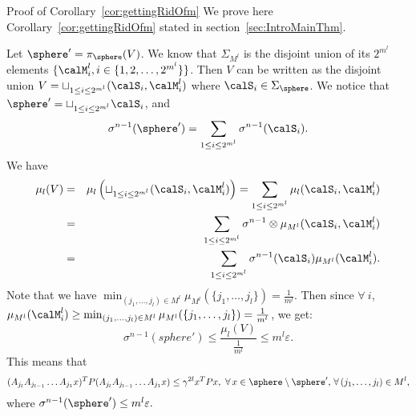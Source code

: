 \begin{section}{Proof of Corollary~\ref{cor:gettingRidOfm}}\label{proof:cor_m}
We prove here Corollary~\ref{cor:gettingRidOfm} stated in section~\ref{sec:IntroMainThm}.

Let $\sphere' = \pi_{\sphere}(V)$. We know that $\Sigma_{M^l}$ is the disjoint union of its $2^{m^l}$ elements $\{\calM^l_i, i \in \{1,2, \dots, 2^{m^l} \} \}$. Then $V$ can be written as the disjoint union $V = \sqcup_{1 \leq i \leq 2^{m^l}} (\calS_i, \calM^l_i)$ where $\calS_i \in \Sigma_{\sphere}$. We notice that 
$\sphere' = \sqcup_{1 \leq i \leq 2^{m^l}} \calS_i$, 
and
\begin{equation*}
\sigma^{n-1} (\sphere') = \sum_{1 \leq i \leq 2^{m^l}} \sigma^{n-1} (\calS_i).
\end{equation*}
We have 
\begin{eqnarray*}
\mu_l(V) &=& \mu_l \left( \sqcup_{1 \leq i \leq 2^{m^l}} (\calS_i, \calM^l_i) \right) = \sum_{1 \leq i \leq 2^{m^l}} \mu_l(\calS_i, \calM^l_i) \\
 &=& \sum_{1 \leq i \leq 2^{m^l}} \sigma^{n-1} \otimes \mu_{M^l} (\calS_i, \calM^l_i) \\
 & = &\sum_{1 \leq i \leq 2^{m^l}} \sigma^{n-1}(\calS_i) \mu_{M^l} (\calM^l_i).
\end{eqnarray*}
Note that we have $\min_{(j_1,\dots,j_l) \in M^l} \mu_{M^l}(\{j_1,\dots,j_l\}) = \frac{1}{m^l}.$ Then since $ \forall \ i$, $\mu_{M^l}(\calM^l_i) \geq \min_{(j_1,\dots,j_l) \in M^l} \mu_{M^l}(\{j_1,\dots,j_l\}) = \frac{1}{m^l}$, we get:
\begin{equation}
\sigma^{n-1}(sphere') \leq \frac{\mu_l(V)}{\frac{1}{m^l}} \leq m^l \varepsilon.
\end{equation}
This means that 
\begin{equation}\label{eqn:P2}
(A_{j_l} A_{j_{l-1}} \dots A_{j_1} x)^T P (A_{j_l} A_{j_{l-1}} \dots A_{j_1} x) \leq \gamma^{2l} x^T P x,\,\, \forall\, x \in \sphere \setminus \sphere', \,\forall\, (j_1,\dots,j_l) \in M^l,
\end{equation}
where $\sigma^{n-1}(\sphere') \leq m^l \varepsilon.$

\end{section}



